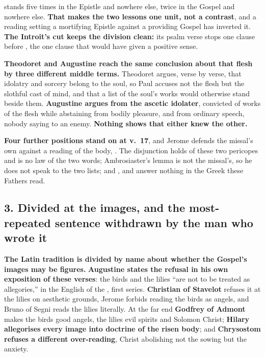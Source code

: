  stands five times in the Epistle and nowhere else, 
twice in the Gospel and nowhere else. \textbf{That makes the two lessons one
unit, not a contrast}, and a reading setting a mortifying Epistle against a
providing Gospel has inverted it. \textbf{The Introit's cut keeps the division
clean:} its psalm verse stops one clause before , the one clause that would have given 
a positive sense.

\textbf{Theodoret and Augustine reach the same conclusion about that flesh by
three different middle terms.} Theodoret
argues, verse by verse, that idolatry and sorcery belong to the soul, so Paul
accuses not the flesh but the slothful cast of mind, and that a list of the
soul's works would otherwise stand beside them. \textbf{Augustine argues from the ascetic
idolater}, convicted of works of the flesh while abstaining from bodily
pleasure, and from ordinary speech, nobody saying  to an enemy. \textbf{Nothing shows that either knew the other.}

\textbf{Four further positions stand on  at v.~17}, and Jerome
defends the missal's own  against a reading of the body, . The
disjunction holds of these two pericopes and is no law of the two words;
Ambrosiaster's lemma is not the missal's, so he does not speak to the two
lists; and ,  and  answer nothing
in the Greek these Fathers read.

\subsection*{3. Divided at the images, and the most-repeated sentence withdrawn by the man who wrote it}

\textbf{The Latin tradition is divided by name about whether the Gospel's images
may be figures.} \textbf{Augustine states the refusal in his own exposition of
these verses}: the birds and the lilies ``are not to be treated as
allegories,'' in the English of the ,
first series. \textbf{Christian of Stavelot} refuses it at the lilies on
aesthetic grounds, Jerome forbids reading the birds as angels, and Bruno of
Segni reads the lilies literally. At the far end
\textbf{Godfrey of Admont} makes the birds good angels, the lilies evil spirits
and Solomon Christ; \textbf{Hilary allegorises every image into doctrine of the
risen body}; and \textbf{Chrysostom refuses a different over-reading}, Christ
abolishing not the sowing but the anxiety.


